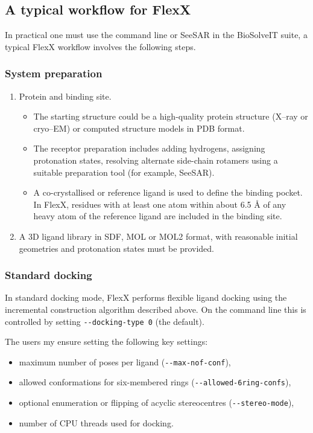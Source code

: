 \documentclass[12pt, a4paper]{article}
\begin{document}
\subsection{A typical workflow for FlexX}

In practical one must use the command line or SeeSAR in the BioSolveIT suite, a typical FlexX workflow involves the following steps.

\subsubsection{System preparation}

\begin{enumerate}
\item Protein and binding site.
\begin{itemize}
  \item The starting structure could be a high-quality protein structure (X--ray or cryo--EM) or computed structure models in PDB format.
  \item The receptor preparation includes adding hydrogens, assigning protonation states, resolving alternate side-chain rotamers using a suitable preparation tool (for example, SeeSAR).
  \item A co-crystallised or reference ligand is used to define the binding pocket. In FlexX, residues with at least one atom within about 6.5 \r{A} of any heavy atom of the reference ligand are included in the binding site.
\end{itemize}

\item A 3D ligand library in SDF, MOL or MOL2 format, with reasonable initial geometries and protonation states must be provided.

\end{enumerate}

\subsubsection{Standard docking}
In standard docking mode, FlexX performs flexible ligand docking using the incremental construction algorithm described above. On the command line this is controlled by setting \verb|--docking-type 0| (the default).

The users my ensure setting the following key settings:
\begin{itemize}
  \item maximum number of poses per ligand (\verb|--max-nof-conf|),
  \item allowed conformations for six-membered rings (\verb|--allowed-6ring-confs|),
  \item optional enumeration or flipping of acyclic stereocentres (\verb|--stereo-mode|),
  \item number of CPU threads used for docking.
\end{itemize}
\end{document}
